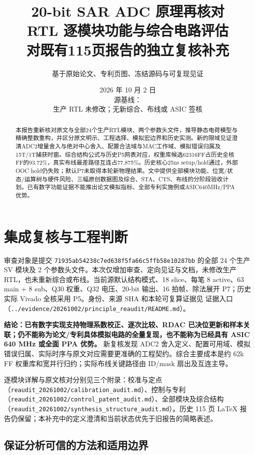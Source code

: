 \documentclass[UTF8,fontset=fandol,10pt,a4paper,openany]{ctexrep}
\title{20-bit SAR ADC 原理再核对\\RTL 逐模块功能与综合电路评估\\\large 对既有115页报告的独立复核补充}
\author{基于原始论文、专利页图、冻结源码与可复现见证}
\date{2026 年 10 月 2 日\\源基线：\code{71935ab54238c7ed638f5fa66c5ffb58e10287bb}\\生产 RTL 未修改；无新综合、布线或 ASIC 签核}
\newcommand{\code}[1]{\nolinkurl{#1}}
\begin{document}
\maketitle
\begin{abstract}
本报告重新核对原文与全部24个生产RTL模块、两个参数头文件，推导静态电荷模型与精确整数重构，并区分原文明示、工程选择、模拟宏边界和历史实测。新的限域见证澄清ADC2增量舍入与绝对中心舍入、配置合法域与MAC工作域、模拟错误归属及15T/1T捕获时窗。综合结构公式与历史P5网表对应，权重库候选62316FF占历史全核FF的93.72\%，真实布线最差路径互连占77.875\%。历史核心25ns setup/hold通过，外部OOC hold仍失败；默认P7未取得本轮新物理结果。文中提供全部模块功能、位宽/状态/运算树与硬件风险、三幅原创数据图及综合、STA、CTS、布线的分阶段验收计划。已有数字功能证据不能推出论文模拟指标、全部专利实施例或ASIC640MHz/PPA优势。
\end{abstract}\tableofcontents
\chapter{集成复核与工程判断}



审查对象是提交 \code{71935ab54238c7ed638f5fa66c5ffb58e10287bb} 的全部 24 个生产 SV 模块及 2 个参数头文件。本次仅增加审查、定向见证与文档，未修改生产 RTL，也未重新综合或布线。当前源默认结构模式、18 slice、每笔 8 active、63 main + 8 sub、Q30 权重、Q32 电压、20-bit 输出、16 拍帧、除法展开 P7；历史实际 Vivado 全核采用 P5。身份、来源 SHA 和本轮可复算证据见 证据入口（\code{../evidence/20261002/principle_reaudit/README.md}）。


\textbf{结论：已有数字实现支持物理系数校正、逐次比较、RDAC 已决位更新和样本关联；仍不能称为论文/专利具体模拟电路的全量复现，也不能称为已经具有 ASIC 640 MHz 或全面 PPA 优势。} 新复核发现 ADC2 舍入定义、配置可用域、模拟错误归属、实际时序与原文对应需要更准确的工程契约。综合主要成本是约 62k FF 权重库和宽并行归约；实际布线关键路径由 ID/mask 扇出及互连主导。


逐模块详解与原文核对分别见三个附录：校准与定点（\code{reaudit_20261002/calibration_audit.md}）、控制与专利（\code{reaudit_20261002/control_patent_audit.md}）、全部模块及综合结构（\code{reaudit_20261002/synthesis_structure_audit.md}）。历史 115 页 LaTeX 报告仍保留；本补充中的定义澄清和当前状态优先于旧报告的简略表述。


\section{保证分析可信的方法和适用边界}
\end{document}
